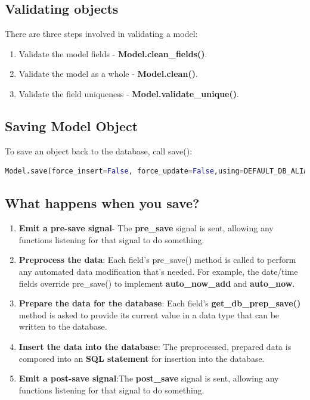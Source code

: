 \subsection{Validating objects}
There are three steps involved in validating a model:
\begin{enumerate}
	\item Validate the model fields - \textbf{Model.clean\_fields()}.
	\item Validate the model as a whole - \textbf{Model.clean()}.
	\item Validate the field uniqueness - \textbf{Model.validate\_unique()}.
\end{enumerate}
\newpage
\subsection{Saving Model Object}
To save an object back to the database, call save():
\begin{lstlisting}[language=python,numbers=none]
Model.save(force_insert=False, force_update=False,using=DEFAULT_DB_ALIAS, update_fields=None)
\end{lstlisting}
\subsection{What happens when you save?}
\begin{enumerate}
	\item  \textbf{Emit a pre-save signal}- The \textbf{pre\_save} signal is sent, allowing any functions listening for that signal to do something.

	\item \textbf{Preprocess the data}: Each field's pre\_save() method is called to perform any automated data modification that's needed. For example, the date/time fields override pre\_save() to implement \textbf{auto\_now\_add} and	\textbf{auto\_now}.
	
	\item \textbf{Prepare the data for the database}: Each field's \textbf{get\_db\_prep\_save()} method is asked to provide its current value in a data type that can be written to the database.
	
	\item \textbf{Insert the data into the database}: The preprocessed, prepared data is composed into an \textbf{SQL statement} for insertion into the database.
	
	\item \textbf{Emit a post-save signal}:The \textbf{post\_save} signal is sent, allowing any functions listening for that signal to do something.
\end{enumerate}
